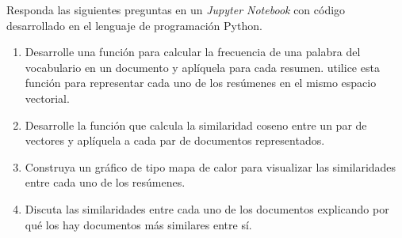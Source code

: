 \documentclass{article}
\begin{document}
Responda las siguientes preguntas en un \textit{Jupyter Notebook} con código desarrollado en el lenguaje de programación Python.

\begin{enumerate}
	\item Desarrolle una función para calcular la frecuencia de una palabra del vocabulario en un documento y aplíquela para cada resumen. utilice esta función para representar cada uno de los resúmenes en el mismo espacio vectorial.
	\item Desarrolle la función que calcula la similaridad coseno entre un par de vectores y aplíquela a cada par de documentos representados.
	\item Construya un gráfico de tipo mapa de calor para visualizar las similaridades entre cada uno de los resúmenes.
	\item Discuta las similaridades entre cada uno de los documentos explicando por qué los hay documentos más similares entre sí.
\end{enumerate}
\end{document}
